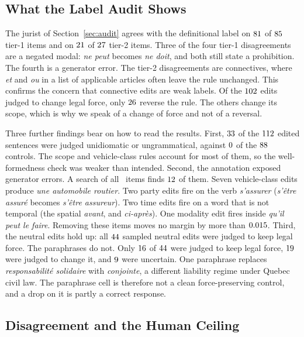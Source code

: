 \documentclass{BVP_JCLLT}
\newcommand{\rev}[1]{#1}
\newcommand{\rev}[1]{{\color{revcol}#1}}
\begin{document}
\rev{\subsection{What the Label Audit Shows}\label{sec:auditresults}

The jurist of Section~\ref{sec:audit} agrees with the definitional
label on $81$ of $85$ tier-1 items and on $21$ of
$27$ tier-2 items. Three of the four tier-1 disagreements are a negated modal: \emph{ne peut}
becomes \emph{ne doit}, and both still state a prohibition. The fourth is a
generator error.
The tier-2 disagreements are connectives, where \emph{et} and \emph{ou} in a list
of applicable articles often leave the rule unchanged. This confirms the
concern that connective edits are weak labels. Of the $102$ edits judged to
change legal force, only $26$ reverse the rule. The others change its
scope, which is why we speak of a change of force and not of a reversal.

Three further findings bear on how to read the results. First, $33$
of the $112$ edited sentences were judged unidiomatic or ungrammatical,
against $0$ of the $88$ controls. The scope and vehicle-class rules
account for most of them, so the well-formedness check was weaker than intended.
Second, the annotation exposed generator errors. A search of all \numedits\
items finds $12$ of them. Seven vehicle-class edits produce \emph{une
automobile routier}. Two party edits fire on the verb \emph{s'assurer}
(\emph{s'\^etre assur\'e} becomes \emph{s'\^etre assureur}). Two time edits fire
on a word that is not temporal (the spatial \emph{avant}, and
\emph{ci-apr\`es}). One modality edit fires inside \emph{qu'il peut le faire}. Removing these items moves no
margin by more than $0.015$. Third, the neutral edits hold up: all
$44$ sampled neutral edits were judged to keep legal force. The paraphrases
do not. Only $16$ of $44$ were judged to keep legal force,
$19$ were judged to change it, and $9$ were uncertain.
One paraphrase replaces \emph{responsabilit\'e solidaire} with \emph{conjointe},
a different liability regime under Quebec civil law. The paraphrase cell is
therefore not a clean force-preserving control, and a drop on it is partly a
correct response.}

\subsection{Disagreement and the Human Ceiling}\label{sec:ceiling}
\end{document}
